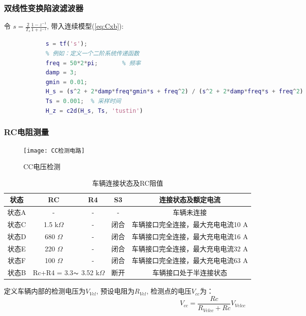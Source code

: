         \subsubsection*{双线性变换陷波滤波器}
            令 $s = \frac{2}{T_s}\frac{1-z^{-1}}{1+z^{-1}}$, 带入连续模型(\ref{eq:Cxb}):
        \begin{lstlisting}[language = matlab]
            % 定义s变量
            s = tf('s');
            % 例如：定义一个二阶系统传递函数
            freq = 50*2*pi;       % 频率
            damp = 3;             
            gmin = 0.01;
            H_s = (s^2 + 2*damp*freq*gmin*s + freq^2) / (s^2 + 2*damp*freq*s + freq^2)
            Ts = 0.001;  % 采样时间
            H_z = c2d(H_s, Ts, 'tustin')
        \end{lstlisting}
        

        \subsubsection*{RC电阻测量}
            \begin{figure}[H]
                \centering
                \texttt{[image: CC检测电路]}
                \caption{CC电压检测}
                \label{fig:C13}
            \end{figure}


        \begin{table}[!htbp]
            \renewcommand{\arraystretch}{1.3}
            \centering
            \caption{车辆连接状态及RC阻值\cite{GB18487_1}}
            \begin{tabular}{ccccc}   
                 \toprule
                 状态  & RC  & R4 & S3 & 连接状态及额定电流\\    
                 \midrule
                 状态A  & -  & - & - &  车辆未连接 \\
                 状态C  & 1.5 k$\Omega$  & - & 闭合 &  车辆接口完全连接，最大充电电流10 A \\
                 状态D  & 680 $\Omega$  & - &  闭合 &  车辆接口完全连接，最大充电电流16 A  \\
                 状态E  & 220 $\Omega$ & - &   闭合 &  车辆接口完全连接，最大充电电流32 A  \\
                 状态F  & 100 $\Omega$ & - &   闭合 &  车辆接口完全连接，最大充电电流63 A  \\
                 状态B  & \multicolumn{2}{c}{Rc+R4 = 3.3$\thicksim$ 3.52 k$\Omega$} & 断开 &车辆接口处于半连接状态\\
                 \bottomrule
            \end{tabular}
            \label{tab:RC1}
       \end{table}
       定义车辆内部的检测电压为$V_{Vel}$, 预设电阻为$R_{Vel}$, 检测点的电压$V_{cc}$为：
            \begin{equation}
                V_{cc} = \frac{Rc}{R_{Velcc}+Rc} V_{Velcc}
            \end{equation}

